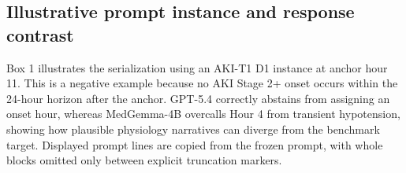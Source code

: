 \documentclass[pdflatex,sn-nature]{sn-jnl}
\begin{document}


\subsection{Illustrative prompt instance and response contrast}

Box 1 illustrates the serialization using an AKI-T1 D1 instance at anchor hour 11. This is a negative example because no AKI Stage 2+ onset occurs within the 24-hour horizon after the anchor. GPT-5.4 correctly abstains from assigning an onset hour, whereas MedGemma-4B overcalls Hour 4 from transient hypotension, showing how plausible physiology narratives can diverge from the benchmark target. Displayed prompt lines are copied from the frozen prompt, with whole blocks omitted only between explicit truncation markers.
\end{document}
